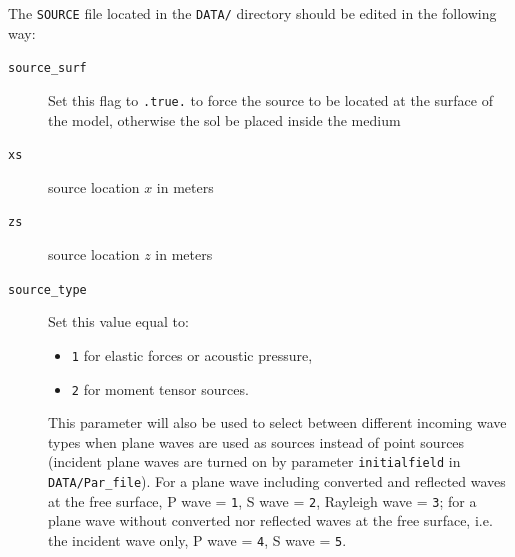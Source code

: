 The \texttt{SOURCE} file located in the \texttt{DATA/} directory should be edited in the following way:
%
\begin{description}
\item[{\texttt{source\_surf}}] Set this flag to \texttt{.true.} to force the source to be located at the surface of the model, otherwise
the sol be placed inside the medium

\item[{\texttt{xs}}] source location $x$ in meters

\item[{\texttt{zs}}] source location $z$ in meters

\item[{\texttt{source\_type}}] Set this value equal to:
\begin{itemize}
\item \texttt{1} for elastic forces or acoustic pressure,
\item \texttt{2} for moment tensor sources.
\end{itemize}
This parameter will also be used to select between different incoming wave types when plane waves are used as sources instead of point sources
(incident plane waves are turned on by parameter \texttt{initialfield} in \texttt{DATA/Par\_file}).
For a plane wave including converted and reflected waves at the free surface, P wave = \texttt{1}, S wave = \texttt{2}, Rayleigh wave = \texttt{3};
for a plane wave without converted nor reflected waves at the free surface, i.e. the incident wave only, P wave = \texttt{4}, S wave = \texttt{5}.


\end{description}
